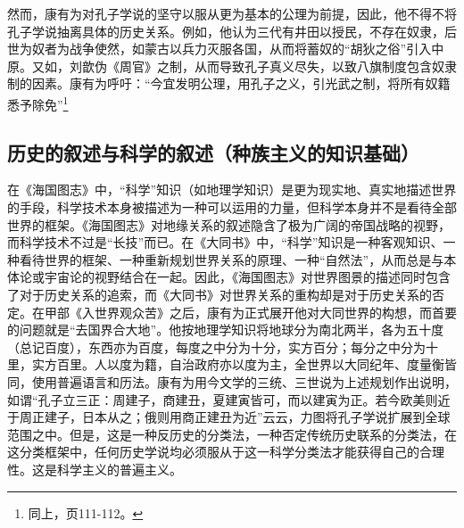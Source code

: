 \documentclass[a4paper, 12pt, openright]{ctexbook}
\begin{document}
然而，康有为对孔子学说的坚守以服从更为基本的公理为前提，因此，他不得不将孔子学说抽离具体的历史关系。例如，他认为三代有井田以授民，不存在奴隶，后世为奴者为战争使然，如蒙古以兵力灭服各国，从而将蓄奴的“胡狄之俗”引入中原。又如，刘歆伪《周官》之制，从而导致孔子真义尽失，以致八旗制度包含奴隶制的因素。康有为呼吁：“今宜发明公理，用孔子之义，引光武之制，将所有奴籍悉予除免”\footnote{同上，页111-112。}

\subsection{历史的叙述与科学的叙述（种族主义的知识基础）}

在《海国图志》中，“科学”知识（如地理学知识）是更为现实地、真实地描述世界的手段，科学技术本身被描述为一种可以运用的力量，但科学本身并不是看待全部世界的框架。《海国图志》对地缘关系的叙述隐含了极为广阔的帝国战略的视野，而科学技术不过是“长技”而已。在《大同书》中，“科学”知识是一种客观知识、一种看待世界的框架、一种重新规划世界关系的原理、一种“自然法”，从而总是与本体论或宇宙论的视野结合在一起。因此，《海国图志》对世界图景的描述同时包含了对于历史关系的追索，而《大同书》对世界关系的重构却是对于历史关系的否定。在甲部《入世界观众苦》之后，康有为正式展开他对大同世界的构想，而首要的问题就是“去国界合大地”。他按地理学知识将地球分为南北两半，各为五十度（总记百度），东西亦为百度，每度之中分为十分，实方百分；每分之中分为十里，实方百里。人以度为籍，自治政府亦以度为主，全世界以大同纪年、度量衡皆同，使用普遍语言和历法。康有为用今文学的三统、三世说为上述规划作出说明，如谓“孔子立三正：周建子，商建丑，夏建寅皆可，而以建寅为正。若今欧美则近于周正建子，日本从之；俄则用商正建丑为近”云云，力图将孔子学说扩展到全球范围之中。但是，这是一种反历史的分类法，一种否定传统历史联系的分类法，在这分类框架中，任何历史学说均必须服从于这一科学分类法才能获得自己的合理性。这是科学主义的普遍主义。
\end{document}
